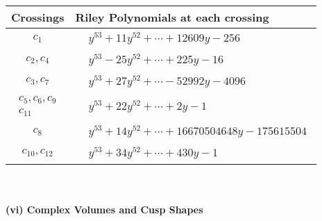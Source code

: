 \documentclass[1p]{elsarticle_modified}
\theoremstyle{definition}
\begin{document}
\begin{tabular}{m{50pt}|m{274pt}}
Crossings & \hspace{64pt}Riley Polynomials at each crossing \\
\hline $$\begin{aligned}c_{1}\end{aligned}$$&$\begin{aligned}
&y^{53}+11 y^{52}+\cdots+12609 y-256
\end{aligned}$\\
\hline $$\begin{aligned}c_{2},c_{4}\end{aligned}$$&$\begin{aligned}
&y^{53}-25 y^{52}+\cdots+225 y-16
\end{aligned}$\\
\hline $$\begin{aligned}c_{3},c_{7}\end{aligned}$$&$\begin{aligned}
&y^{53}+27 y^{52}+\cdots-52992 y-4096
\end{aligned}$\\
\hline $$\begin{aligned}c_{5},c_{6},c_{9}\\c_{11}\end{aligned}$$&$\begin{aligned}
&y^{53}+22 y^{52}+\cdots+2 y-1
\end{aligned}$\\
\hline $$\begin{aligned}c_{8}\end{aligned}$$&$\begin{aligned}
&y^{53}+14 y^{52}+\cdots+16670504648 y-175615504
\end{aligned}$\\
\hline $$\begin{aligned}c_{10},c_{12}\end{aligned}$$&$\begin{aligned}
&y^{53}+34 y^{52}+\cdots+430 y-1
\end{aligned}$\\
\hline
\end{tabular}\\~\\
\newpage\flushleft \textbf{(vi) Complex Volumes and Cusp Shapes}
\end{document}
